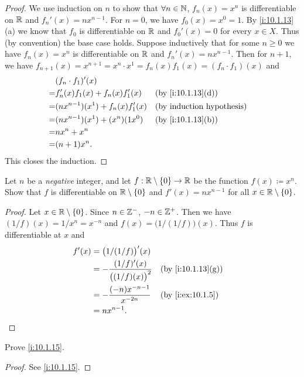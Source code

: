 \begin{proof}
  We use induction on \(n\) to show that \(\forall n \in \mathbb{N}\), \(f_n(x) = x^n\) is differentiable on \(\mathbb{R}\) and \(f_n'(x) = n x^{n - 1}\).
  For \(n = 0\), we have \(f_0(x) = x^0 = 1\).
  By \cref{i:10.1.13}(a) we know that \(f_0\) is differentiable on \(\mathbb{R}\) and \(f_0'(x) = 0\) for every \(x \in X\).
  Thus (by convention) the base case holds.
  Suppose inductively that for some \(n \geq 0\) we have \(f_n(x) = x^n\) is differentiable on \(\mathbb{R}\) and \(f_n'(x) = n x^{n - 1}\).
  Then for \(n + 1\), we have \(f_{n + 1}(x) = x^{n + 1} = x^n \cdot x^1 = f_n(x) f_1(x) = (f_n \cdot f_1)(x)\) and
  \begin{align*}
      & (f_n \cdot f_1)'(x)                                        \\
    = & f_n'(x) f_1(x) + f_n(x) f_1'(x)     &  & \by{i:10.1.13}[d] \\
    = & (n x^{n - 1})(x^1) + f_n(x) f_1'(x) &  & \byIH             \\
    = & (n x^{n - 1})(x^1) + (x^n)(1 x^0)   &  & \by{i:10.1.13}[b] \\
    = & n x^n + x^n                                                \\
    = & (n + 1) x^n.
  \end{align*}
  This closes the induction.
\end{proof}

\begin{ex}\label{i:ex:10.1.6}
  Let \(n\) be a \emph{negative} integer, and let \(f : \mathbb{R} \setminus \left\lbrace0\right\rbrace \to \mathbb{R}\) be the function \(f(x) \coloneqq x^n\).
  Show that \(f\) is differentiable on \(\mathbb{R} \setminus \left\lbrace0\right\rbrace\) and \(f'(x) = n x^{n - 1}\) for all \(x \in \mathbb{R} \setminus \left\lbrace0\right\rbrace\).
\end{ex}

\begin{proof}
  Let \(x \in \mathbb{R} \setminus \left\lbrace0\right\rbrace\).
  Since \(n \in \mathbb{Z}^-\), \(-n \in \mathbb{Z}^+\).
  Then we have \((1 / f)(x) = 1 / x^n = x^{-n}\) and \(f(x) = \big(1 / (1 / f)\big)(x)\).
  Thus \(f\) is differentiable at \(x\) and
  \begin{align*}
    f'(x) & = \big(1 / (1 / f)\big)'(x)                                           \\
          & = -\dfrac{(1 / f)'(x)}{\big((1 / f)(x)\big)^2} &  & \by{i:10.1.13}[g] \\
          & = -\dfrac{(-n) x^{-n - 1}}{x^{-2n}}            &  & \by{i:ex:10.1.5}  \\
          & = n x^{n - 1}.
  \end{align*}
\end{proof}

\begin{ex}\label{i:ex:10.1.7}
  Prove \cref{i:10.1.15}.
\end{ex}

\begin{proof}
  See \cref{i:10.1.15}.
\end{proof}
